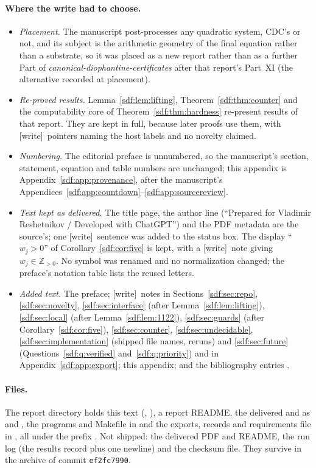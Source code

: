 \documentclass[11pt,a4paper]{article}
\theoremstyle{definition}
\theoremstyle{remark}
\newcommand{\Z}{\mathbb Z}
\newcommand{\wtag}{\textup{[write]}}
\begin{document}
\paragraph{Where the write had to choose.}
\begin{itemize}
\item \emph{Placement.} The manuscript post-processes any quadratic system,
CDC's or not, and its subject is the arithmetic geometry of the final
equation rather than a substrate, so it was placed as a new report rather
than as a further Part of \emph{canonical-diophantine-certificates} after
that report's Part~XI (the alternative recorded at placement).
\item \emph{Re-proved results.} Lemma~\ref{sdf:lem:lifting},
Theorem~\ref{sdf:thm:counter} and the computability core of
Theorem~\ref{sdf:thm:hardness} re-present results of that report. They are
kept in full, because later proofs use them, with \wtag\ pointers naming
the host labels and no novelty claimed.
\item \emph{Numbering.} The editorial preface is unnumbered, so the
manuscript's section, statement, equation and table numbers are unchanged;
this appendix is Appendix~\ref{sdf:app:provenance}, after the manuscript's
Appendices~\ref{sdf:app:countdown}--\ref{sdf:app:sourcereview}.
\item \emph{Text kept as delivered.} The title page, the author line
(``Prepared for Vladimir Reshetnikov / Developed with ChatGPT'') and the PDF
metadata are the source's; one \wtag\ sentence was added to the status box.
The display ``$w_j>0$'' of Corollary~\ref{sdf:cor:five} is kept, with a
\wtag\ note giving $w_j\in\Z_{>0}$. No symbol was renamed and no
normalization changed; the preface's notation table lists the reused
letters.
\item \emph{Added text.} The preface; \wtag\ notes in
Sections~\ref{sdf:sec:repo}, \ref{sdf:sec:novelty}, \ref{sdf:sec:interface}
(after Lemma~\ref{sdf:lem:lifting}), \ref{sdf:sec:local} (after
Lemma~\ref{sdf:lem:1122}), \ref{sdf:sec:guards} (after
Corollary~\ref{sdf:cor:five}), \ref{sdf:sec:counter},
\ref{sdf:sec:undecidable}, \ref{sdf:sec:implementation} (shipped file names,
reruns) and \ref{sdf:sec:future} (Questions~\ref{sdf:q:verified}
and~\ref{sdf:q:priority}) and in Appendix~\ref{sdf:app:export}; this
appendix; and the bibliography entries
\cite{cdcreport,pqcreport,review13,ramanujan,minsky}.
\end{itemize}

\paragraph{Files.} The report directory holds this text
(, ), a report README, the delivered
 and  as
 and
, the programs and Makefile in
 and the exports, records and requirements file in
, all under the prefix . Not shipped:
the delivered PDF and README, the run log (the results record plus one
newline) and the checksum file. They survive in the archive of commit
\texttt{ef2fc7990}.
\end{document}
